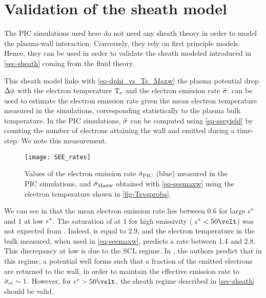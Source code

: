 
\section{Validation of the sheath model }
  \label{sec-sheath_validation}
  
  The \ac{PIC} simulations used here do not need any sheath theory in order to model the plasma-wall interaction.
  Conversely, they rely on first principle models.
  Hence, they can be used in order to validate the sheath modeled introduced in \cref{sec-sheath} coming from the fluid theory.
  
  This sheath model links with \cref{eq-dphi_vs_Te_Maxw} the plasma potential drop $\Delta \phi$ with the electron temperature $\mathrm{T_e}$ and the electron emission rate $ \bar{\sigma }$.
   can be used to estimate the electron emission rate given the mean electron temperature measured in the simulations, corresponding statistically to the plasma bulk temperature.   
  In the \ac{PIC} simulations, $ \bar{\sigma }$ can be computed using \cref{eq-seeyield} by counting the number of electrons attaining the wall and emitted during a time-step.
  We note \ratepic this measurement.
  \vspace{1em}
   
  \begin{figure}[hbt]
    \centering
    \texttt{[image: SEE\_rates]}
    \caption{Values of the electron emission rate $ \bar{\sigma }_{\rm PIC}$ (blue) measured in the \acs{PIC} simulations, and $  \bar{\sigma }_{\rm Maxw}$ obtained with \cref{eq-seemaxw} using the electron temperature shown in \cref{fig-Tevsproba}. }
    \label{fig-seeparamesMaxw}
  \end{figure}
  
  
  We can see in  that the mean electron emission rate lies between 0.6 for large $\epsilon^{*}$ and 1 at low $\epsilon^{*}$.
  The saturation of \ratepic at 1 for high emissivity ( $\crover < 50 \volt$) was not expected from \ratemaxw.
  Indeed, \probamax is equal to 2.9, and the electron temperature in the bulk measured, when used in \cref{eq-seemaxw}, predicts a rate between 1.4 and 2.8.
  This discrepancy at low \crover is due to the \ac{SCL} regime.
  In \citet{hobbs1967}, the authors predict that in this regime, a potential well forms such that a fraction of the emitted electrons are returned to the wall, in order to maintain the effective emission rate to $ \bar{\sigma }_{\rm cr}\sim1$.
  However, for $\crover > 50 \volt$, the sheath regime described in \cref{sec-sheath} should be valid.
   
